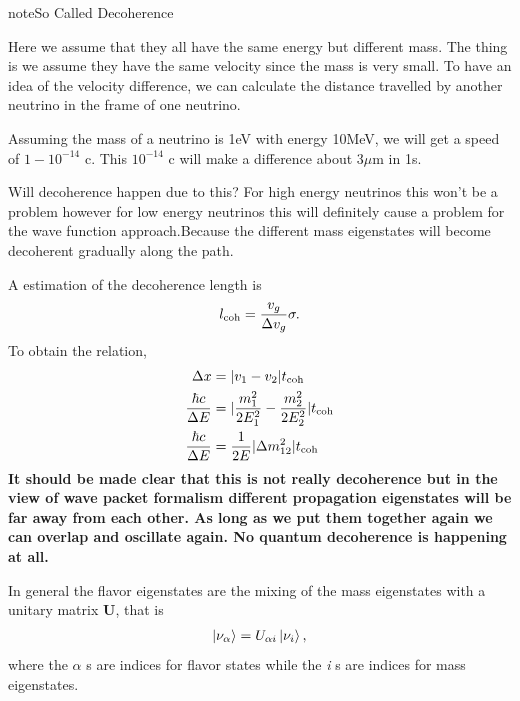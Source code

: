 \documentclass[letterpaper,12pt,english]{sphinxmanual}
\newcommand{\ket}[1]{\left| #1\right\rangle}
\begin{document}
\begin{notice}{note}{So Called Decoherence}

Here we assume that they all have the same energy but different mass. The thing is we assume they have the same velocity since the mass is very small. To have an idea of the velocity difference, we can calculate the distance travelled by another neutrino in the frame of one neutrino.

Assuming the mass of a neutrino is 1eV with energy 10MeV, we will get a speed of \(1-10^{-14}\) c. This \(10^{-14}\) c will make a difference about \(3\mu\mathrm{ m}\) in 1s.

Will decoherence happen due to this? For high energy neutrinos this won't be a problem however for low energy neutrinos this will definitely cause a problem for the wave function approach.Because the different mass eigenstates will become decoherent gradually along the path.

A estimation of the decoherence length is
\begin{gather}
\begin{split}l_{\mathrm{coh}}=\frac{v_g}{\Delta v_g}\sigma.\end{split}\notag
\end{gather}
To obtain the relation,
\begin{gather}
\begin{split}\Delta x &= \lvert v_1 - v_2 \rvert t_{\mathrm{coh}}\\
\frac{\hbar c}{\Delta E} & = \lvert \frac{m_1^2}{2E_1^2} - \frac{m_2^2}{2E_2^2} \rvert t_{\mathrm{coh}} \\
\frac{\hbar c}{\Delta E} & = \frac{1}{2E}\lvert \Delta m_{12}^2 \rvert t_{\mathrm{coh}}\end{split}\notag
\end{gather}
\textbf{It should be made clear that this is not really decoherence but in the view of wave packet formalism different propagation eigenstates will be far away from each other. As long as we put them together again we can overlap and oscillate again. No quantum decoherence is happening at all.}
\end{notice}

In general the flavor eigenstates are the mixing of the mass eigenstates with a unitary matrix \(\mathbf U\), that is
\begin{gather}
\begin{split}\ket{\nu_{\alpha}} =  U_{\alpha i} \ket{\nu_i},\end{split}\notag
\end{gather}
where the \(\alpha\) s are indices for flavor states while the \emph{i} s are indices for mass eigenstates.
\end{document}
